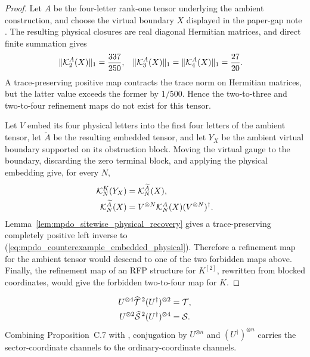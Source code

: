 \begin{proof}\leanok
    Let $A$ be the four-letter rank-one tensor underlying the ambient
    construction, and choose the virtual boundary $X$ displayed in the
    paper-gap note \cite{gap:cpsv16_prop_c15_blocking_channel_false}. The
    resulting physical closures are real diagonal Hermitian matrices, and
    direct finite summation gives
    \begin{align}
        \lVert\mathcal K_2^A(X)\rVert_1
         & =\frac{337}{250},
         & \lVert\mathcal K_3^A(X)\rVert_1
         & =\lVert\mathcal K_4^A(X)\rVert_1=\frac{27}{20}.
        \notag
    \end{align}
    A trace-preserving positive map contracts the trace norm on Hermitian
    matrices, but the latter value exceeds the former by $1/500$. Hence the
    two-to-three and two-to-four refinement maps do not exist for this tensor.

    Let $V$ embed its four physical letters into the first four letters of the
    ambient tensor, let $\widetilde A$ be the resulting embedded tensor, and let
    $Y_X$ be the ambient virtual boundary supported on its obstruction block.
    Moving the virtual gauge to the boundary, discarding the zero terminal
    block, and applying the physical embedding give, for every $N$,
    \begin{align}
        \mathcal K_N^K(Y_X)
         & =\mathcal K_N^{\widetilde A}(X),
        \notag                                                     \\
        \mathcal K_N^{\widetilde A}(X)
         & =V^{\otimes N}\mathcal K_N^A(X)(V^{\otimes N})^\dagger.
        \label{eq:mpdo_counterexample_embedded_physical}
    \end{align}
    Lemma~\ref{lem:mpdo_sitewise_physical_recovery} gives a
    trace-preserving completely positive left inverse to (\ref{eq:mpdo_counterexample_embedded_physical}).
    Therefore a refinement map for the ambient tensor would descend to one of
    the two forbidden maps above. Finally, the refinement map of an RFP
    structure for $K^{[2]}$, rewritten from blocked coordinates, would give
    the forbidden two-to-four map for $K$.
\end{proof}

\begin{align}
    U^{\otimes4}\widehat{\mathcal T}^{\,2}
    (U^\dagger)^{\otimes2}
     & =\mathcal T,
    \label{eq:mpdo_physical_isometry_transport} \\
    U^{\otimes2}\widehat{\mathcal S}^{\,2}
    (U^\dagger)^{\otimes4}
     & =\mathcal S.
    \notag
\end{align}
Combining Proposition~C.7 with
\cite[Appendix~C.2, lines~1510--1563 and 1821--1825]{Cirac2016MPDO_arXiv},
conjugation by $U^{\otimes n}$ and $(U^\dagger)^{\otimes n}$ carries the
sector-coordinate channels to the ordinary-coordinate channels.
